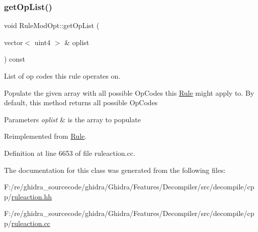 \subsubsection{\texorpdfstring{getOpList()}{getOpList()}}
{\footnotesize\ttfamily void Rule\+Mod\+Opt\+::get\+Op\+List (\begin{DoxyParamCaption}\item[{vector$<$ uint4 $>$ \&}]{oplist }\end{DoxyParamCaption}) const\hspace{0.3cm}{\ttfamily [virtual]}}



List of op codes this rule operates on. 

Populate the given array with all possible Op\+Codes this \mbox{\hyperlink{class_rule}{Rule}} might apply to. By default, this method returns all possible Op\+Codes 
\begin{DoxyParams}{Parameters}
{\em oplist} & is the array to populate \\
\hline
\end{DoxyParams}


Reimplemented from \mbox{\hyperlink{class_rule_a4023bfc7825de0ab866790551856d10e}{Rule}}.



Definition at line 6653 of file ruleaction.\+cc.



The documentation for this class was generated from the following files\+:\begin{DoxyCompactItemize}
\item 
F\+:/re/ghidra\+\_\+sourcecode/ghidra/\+Ghidra/\+Features/\+Decompiler/src/decompile/cpp/\mbox{\hyperlink{ruleaction_8hh}{ruleaction.\+hh}}\item 
F\+:/re/ghidra\+\_\+sourcecode/ghidra/\+Ghidra/\+Features/\+Decompiler/src/decompile/cpp/\mbox{\hyperlink{ruleaction_8cc}{ruleaction.\+cc}}\end{DoxyCompactItemize}
